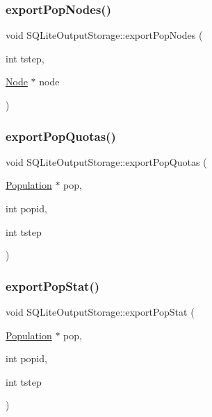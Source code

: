 \mbox{\label{class_s_q_lite_output_storage_a3800a1fa7ec6fd2a4d567ee45c839918}} 
\subsubsection{\texorpdfstring{exportPopNodes()}{exportPopNodes()}}
{\footnotesize\ttfamily void S\+Q\+Lite\+Output\+Storage\+::export\+Pop\+Nodes (\begin{DoxyParamCaption}\item[{int}]{tstep,  }\item[{\mbox{\hyperlink{class_node}{Node}} $\ast$}]{node }\end{DoxyParamCaption})}

\mbox{\label{class_s_q_lite_output_storage_a3e017d586cf80142baef2fdc1e7318ef}} 
\subsubsection{\texorpdfstring{exportPopQuotas()}{exportPopQuotas()}}
{\footnotesize\ttfamily void S\+Q\+Lite\+Output\+Storage\+::export\+Pop\+Quotas (\begin{DoxyParamCaption}\item[{\mbox{\hyperlink{class_population}{Population}} $\ast$}]{pop,  }\item[{int}]{popid,  }\item[{int}]{tstep }\end{DoxyParamCaption})}

\mbox{\label{class_s_q_lite_output_storage_aee00c8202df05f6d084e21ebc93ea096}} 
\subsubsection{\texorpdfstring{exportPopStat()}{exportPopStat()}}
{\footnotesize\ttfamily void S\+Q\+Lite\+Output\+Storage\+::export\+Pop\+Stat (\begin{DoxyParamCaption}\item[{\mbox{\hyperlink{class_population}{Population}} $\ast$}]{pop,  }\item[{int}]{popid,  }\item[{int}]{tstep }\end{DoxyParamCaption})}

